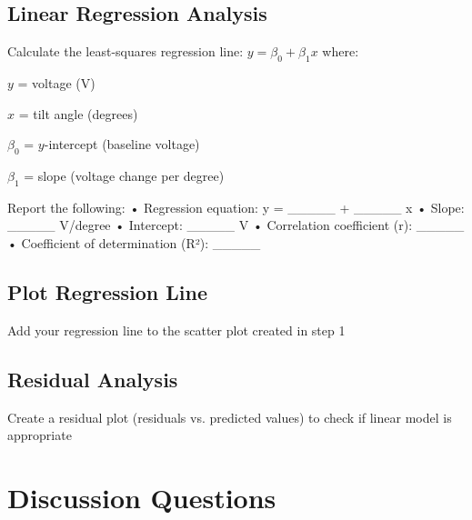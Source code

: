 \documentclass[11pt,twoside]{article}
\numberwithin{equation}{section}
\newcommand{\?}{\stackrel{?}{=}}
\begin{document}
%
\subsection{Linear Regression Analysis}
Calculate the least-squares regression line: $y = \beta_0 + \beta_1 x $ where:
\begin{compactitem}
    \item $y$ = voltage (V)
    \item $x$ = tilt angle (degrees)
      \item $\beta_0$ = $y$-intercept (baseline voltage)  
    \item $\beta_1$ = slope (voltage change per degree)
\end{compactitem}

\begin{calculationbox}
Report the following:
• Regression equation: y =  \_\_\_\_\_ + \_\_\_\_\_ x 
• Slope: \_\_\_\_\_ V/degree
• Intercept: \_\_\_\_\_ V
• Correlation coefficient (r): \_\_\_\_\_
• Coefficient of determination (R²): \_\_\_\_\_
\end{calculationbox}

\subsection{Plot Regression Line}
Add your regression line to the scatter plot created in step 1

\subsection{Residual Analysis}
Create a residual plot (residuals vs. predicted values) to check if linear model is appropriate




\section{Discussion Questions}
\end{document}
